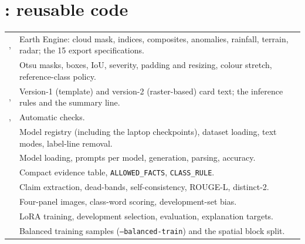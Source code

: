 \section*{: reusable code}
\begin{longtable}{L{5.6cm}L{8.6cm}}
\toprule
{},  & Earth Engine: cloud mask, indices, composites, anomalies, rainfall, terrain, radar; the 15 export specifications. \\
 & Otsu masks, boxes, IoU, severity, padding and resizing, colour stretch, reference-class policy. \\
,  & Version-1 (template) and version-2 (raster-based) card text; the inference rules and the summary line. \\
,  & Automatic checks. \\
 & Model registry (including the laptop checkpoints), dataset loading, text modes, label-line removal. \\
 & Model loading, prompts per model, generation, parsing, accuracy. \\
 & Compact evidence table, \texttt{ALLOWED\_FACTS}, \texttt{CLASS\_RULE}. \\
 & Claim extraction, dead-bands, self-consistency, ROUGE-L, distinct-2. \\
 & Four-panel images, class-word scoring, development-set bias. \\
 & LoRA training, development selection, evaluation, explanation targets. \\
 & Balanced training samples (\texttt{--balanced-train}) and the spatial block split. \\
\bottomrule
\end{longtable}

